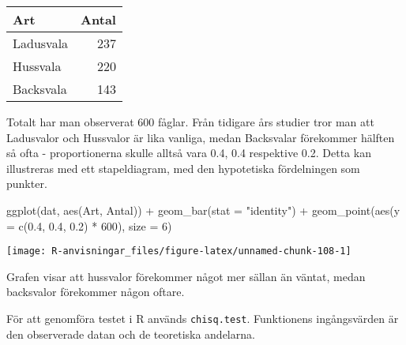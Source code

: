 \documentclass[
]{book}
\newenvironment{Shaded}{\begin{snugshade}}{\end{snugshade}}
\newcommand{\AttributeTok}[1]{\textcolor[rgb]{0.77,0.63,0.00}{#1}}
\newcommand{\DecValTok}[1]{\textcolor[rgb]{0.00,0.00,0.81}{#1}}
\newcommand{\FloatTok}[1]{\textcolor[rgb]{0.00,0.00,0.81}{#1}}
\newcommand{\FunctionTok}[1]{\textcolor[rgb]{0.00,0.00,0.00}{#1}}
\newcommand{\NormalTok}[1]{#1}
\newcommand{\SpecialCharTok}[1]{\textcolor[rgb]{0.00,0.00,0.00}{#1}}
\newcommand{\StringTok}[1]{\textcolor[rgb]{0.31,0.60,0.02}{#1}}
\theoremstyle{definition}
\theoremstyle{definition}
\theoremstyle{definition}
\theoremstyle{definition}
\theoremstyle{remark}
\begin{document}
\begin{table}
\centering
\begin{tabular}[t]{lr}
\toprule
Art & Antal\\
\midrule
Ladusvala & 237\\
Hussvala & 220\\
Backsvala & 143\\
\bottomrule
\end{tabular}
\end{table}

Totalt har man observerat 600 fåglar. Från tidigare års studier tror man att Ladusvalor och Hussvalor är lika vanliga, medan Backsvalar förekommer hälften så ofta - proportionerna skulle alltså vara 0.4, 0.4 respektive 0.2. Detta kan illustreras med ett stapeldiagram, med den hypotetiska fördelningen som punkter.

\begin{Shaded}
\begin{Highlighting}[]
\FunctionTok{ggplot}\NormalTok{(dat, }\FunctionTok{aes}\NormalTok{(Art, Antal)) }\SpecialCharTok{+}
  \FunctionTok{geom\_bar}\NormalTok{(}\AttributeTok{stat =} \StringTok{"identity"}\NormalTok{) }\SpecialCharTok{+}
  \FunctionTok{geom\_point}\NormalTok{(}\FunctionTok{aes}\NormalTok{(}\AttributeTok{y =} \FunctionTok{c}\NormalTok{(}\FloatTok{0.4}\NormalTok{, }\FloatTok{0.4}\NormalTok{, }\FloatTok{0.2}\NormalTok{) }\SpecialCharTok{*} \DecValTok{600}\NormalTok{), }\AttributeTok{size =} \DecValTok{6}\NormalTok{)}
\end{Highlighting}
\end{Shaded}

\begin{center}\texttt{[image: R-anvisningar\_files/figure-latex/unnamed-chunk-108-1]} \end{center}

Grafen visar att hussvalor förekommer något mer sällan än väntat, medan backsvalor förekommer någon oftare.

För att genomföra testet i R används \texttt{chisq.test}. Funktionens ingångsvärden är den observerade datan och de teoretiska andelarna.

\begin{Shaded}
\end{Shaded}
\end{document}
